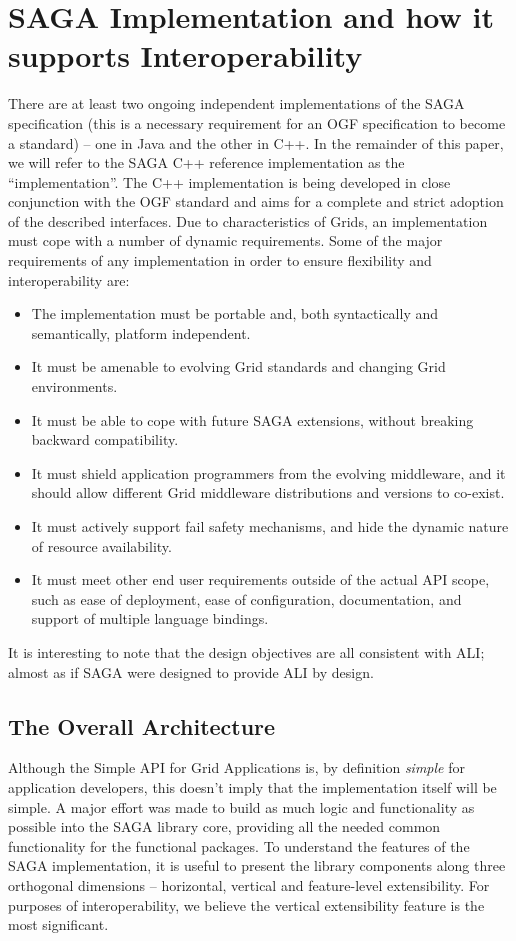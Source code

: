 \documentclass[conference,final]{IEEEtran}
\newcommand{\I}{\textit}
\newenvironment{shortlist}{
  \begin{itemize}
  \setlength{\itemsep}{-0.1em}
}{
  \end{itemize}
}
\begin{document}
\section{SAGA Implementation and how it supports Interoperability}\label{sec:saga_imp}
There are at least two ongoing independent implementations of the SAGA
specification (this is a necessary requirement for an OGF
specification to become a standard) -- one in Java and the other in
C++.  In the remainder of this paper, we will refer to the SAGA C++
reference implementation as the ``implementation''. The C++
implementation is being developed in close conjunction with the OGF
standard and aims for a complete and strict adoption of the described
interfaces.  Due to characteristics of Grids, an implementation must
cope with a number of dynamic requirements.  Some of the major
requirements of any implementation  in order to ensure
flexibility and interoperability are:
\begin{shortlist}
\item The implementation must be portable and, both syntactically and
  semantically, platform independent.
\item It must be amenable to evolving Grid standards and changing Grid
  environments.
\item It must be able to cope with future SAGA extensions, without
  breaking backward compatibility.
\item It must shield application programmers from the evolving
  middleware, and it should allow different Grid
  middleware distributions and versions to co-exist.
\item It must actively support fail safety mechanisms, and hide the
  dynamic nature of resource availability.
\item It must meet other end user requirements outside of the actual
  API scope, such as ease of deployment, ease of configuration,
  documentation, and support of multiple language bindings.
\end{shortlist}

It is interesting to note that the design objectives are all
consistent with ALI; almost as if SAGA were designed to provide ALI by
design.

\subsection{The Overall Architecture}

Although the Simple API for Grid Applications is, by definition
\I{simple} for application developers, this doesn't imply that the
implementation itself will be simple. A major effort was made to build
as much logic and functionality as possible into the SAGA library
core, providing all the needed common functionality for the functional
packages.  To understand the features of the SAGA implementation, it
is useful to present the library components along three orthogonal
dimensions -- horizontal, vertical and feature-level extensibility.
For purposes of interoperability, we believe the vertical
extensibility feature is the most significant. 
\end{document}
